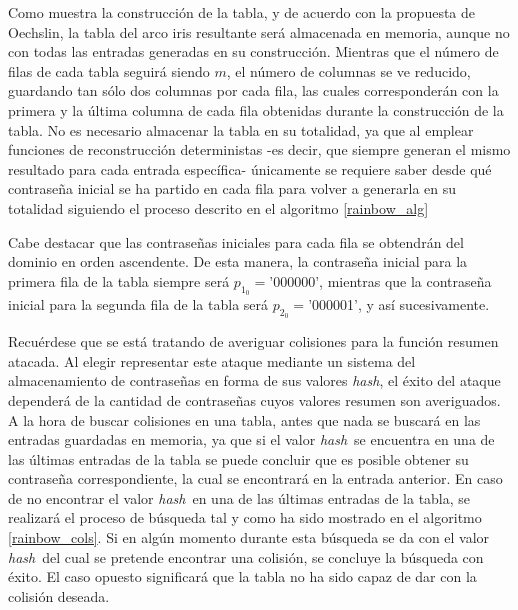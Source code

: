 \documentclass[12pt,spanish,listoffigures,listoftables,listofalgorithms]{tfgetsinf}
\newcommand{\hash}{\textit{hash}}
\begin{document}
Como muestra la construcción de la tabla, y de acuerdo con la propuesta de Oechslin, la tabla del arco iris resultante será almacenada en memoria, aunque no con todas las entradas generadas en su construcción. Mientras que el número de filas de cada tabla seguirá siendo $m$, el número de columnas se ve reducido, guardando tan sólo dos columnas por cada fila, las cuales corresponderán con la primera y la última columna de cada fila obtenidas durante la construcción de la tabla. No es necesario almacenar la tabla en su totalidad, ya que al emplear funciones de reconstrucción deterministas -es decir, que siempre generan el mismo resultado para cada entrada específica- únicamente se requiere saber desde qué contraseña inicial se ha partido en cada fila para volver a generarla en su totalidad siguiendo el proceso descrito en el algoritmo \ref{rainbow_alg}

Cabe destacar que las contraseñas iniciales para cada fila se obtendrán del dominio en orden ascendente. De esta manera, la contraseña inicial para la primera fila de la tabla siempre será $p_{1_0} = $'000000', mientras que la contraseña inicial para la segunda fila de la tabla será $p_{2_0} = $'000001', y así sucesivamente.

Recuérdese que se está tratando de averiguar colisiones para la función resumen atacada. Al elegir representar este ataque mediante un sistema del almacenamiento de contraseñas en forma de sus valores \hash, el éxito del ataque dependerá de la cantidad de contraseñas cuyos valores resumen son averiguados. A la hora de buscar colisiones en una tabla, antes que nada se buscará en las entradas guardadas en memoria, ya que si el valor \hash~se encuentra en una de las últimas entradas de la tabla se puede concluir que es posible obtener su contraseña correspondiente, la cual se encontrará en la entrada anterior. En caso de no encontrar el valor \hash~en una de las últimas entradas de la tabla, se realizará el proceso de búsqueda tal y como ha sido mostrado en el algoritmo \ref{rainbow_cols}. Si en algún momento durante esta búsqueda se da con el valor \hash~del cual se pretende encontrar una colisión, se concluye la búsqueda con éxito. El caso opuesto significará que la tabla no ha sido capaz de dar con la colisión deseada.
\end{document}
